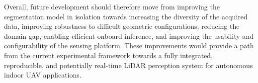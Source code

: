 Overall, future development should therefore move from improving the segmentation model in isolation towards increasing the diversity of the acquired data, improving robustness to difficult geometric configurations, reducing the domain gap, enabling efficient onboard inference, and improving the usability and configurability of the sensing platform. These improvements would provide a path from the current experimental framework towards a fully integrated, reproducible, and potentially real-time LiDAR perception system for autonomous indoor UAV applications.
